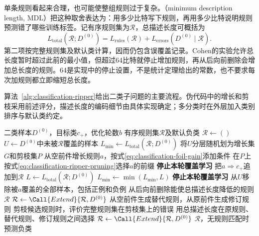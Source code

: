 单条规则看起来合理，也可能使整组规则过于复杂。（minimum description length, MDL）把这种取舍表达为：用多少比特写下规则，再用多少比特说明规则预测错了哪些训练标签。记有序规则集为$\mathcal{R}$，总描述长度可概括为
\begin{equation}
  L_{\mathrm{total}}(\mathcal{R};D^{(0)})
  =L_{\mathrm{rules}}(\mathcal{R})
   +L_{\mathrm{errors}}(D^{(0)}\mid\mathcal{R}).
  \label{eq:classification-rule-description-length}
\end{equation}
第二项按完整规则集及默认类计算，因而仍包含误覆盖记录。Cohen的实验允许总长度暂时超过此前的最小值，但超过64比特就停止增加规则，再从后向前删除会增加总长度的规则。64是实现中的停止设置，不是统计定理给出的常数，也不要求每次加规则都立即缩短总长度。

算法~\ref{alg:classification-ripper}给出二类子问题的主要流程。伪代码中的增长和剪枝采用前述评分，描述长度的编码细节由具体实现确定；多分类时在外层加入类别排序与默认类约定。

\begin{algorithm}[RIPPER的覆盖学习与规则优化]
  \label{alg:classification-ripper}
  \begin{algorithmic}[1]
    \Require 二类样本$D^{(0)}$，目标类$c_+$，优化轮数$b$
    \Ensure 有序规则集$\mathcal{R}$及默认负类
    \State $\mathcal{R}\gets()$
      \State $U\gets D^{(0)}$中未被$\mathcal{R}$覆盖的样本
      \State $L_{\min}\gets L_{\mathrm{total}}(\mathcal{R};D^{(0)})$
        \State 将$U$分层随机划为增长集$G$和剪枝集$P$
        \State 从空前件增长规则$a$，按式\eqref{eq:classification-foil-gain}添加条件
        \State 在$P$上按式\eqref{eq:classification-ripper-pruning}选择$a$的前缀
          \State \textbf{停止本轮覆盖学习}
        \EndIf
        \State 把$a\Longrightarrow c_+$追加到$\mathcal{R}$
        \State $L\gets L_{\mathrm{total}}(\mathcal{R};D^{(0)})$
        \State $L_{\min}\gets\min(L_{\min},L)$
          \State \textbf{停止本轮覆盖学习}
        \EndIf
        \State 从$U$移除被$a$覆盖的全部样本，包括正例和负例
      \EndWhile
      \State 从后向前删除能使总描述长度降低的规则
      \State \Return $\mathcal{R}$
    \EndFunction
    \State $\mathcal{R}\gets\Call{Extend}{\mathcal{R},D^{(0)}}$
        \State 从空前件生成替代规则，从原前件生成修订规则
        \State 剪枝候选规则时，评价完整规则集在剪枝集上的错误
        \State 用总描述长度在原规则、替代规则、修订规则之间选择
      \EndFor
      \State $\mathcal{R}\gets\Call{Extend}{\mathcal{R},D^{(0)}}$
    \EndFor
    \State \Return $\mathcal{R}$，无规则匹配时预测负类
  \end{algorithmic}
\end{algorithm}

